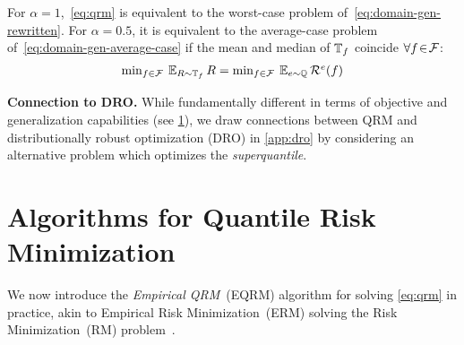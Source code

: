 \documentclass{article}
\begin{document}
\begin{proposition}\label{prop:average-case-equiv}
For $\alpha\!\! =\!\! 1$,~\eqref{eq:qrm} is equivalent to the worst-case problem of~\eqref{eq:domain-gen-rewritten}.
 For $\alpha\! =\! 0.5$, it
%
%
is equivalent to the average-case problem of~\eqref{eq:domain-gen-average-case} if the mean and median of $\mathbb{T}_f$ coincide $\forall f\! \in\! \mathcal{F}$:
%
%
\begin{align}\label{eq:dg-average-case}
\textstyle
    \min_{f\in\mathcal{F}} \: \operatorname{\mathbb{E}}_{R\sim\mathbb{T}_f} R =
    \min_{f\in\mathcal{F}} \: \operatorname{\mathbb{E}}_{e\sim\mathbb{Q}} \mathcal{R}^e(f)
\end{align}%
%
%
%
%
\end{proposition}%
%





%
%
%
%
%
%
%
%
%
%
%
%
%
%
%
%

%




%
%
%
%
%
%
%

%


%
%
%
%
%
%
%
%
%
%
%
%
%
%
%
%
%
%
%
%
%
%
%
%
%


\textbf{Connection to DRO.}  While fundamentally different in terms of objective and generalization capabilities (see \cref{sec:qrm_algs}), we draw connections between QRM and distributionally robust optimization (DRO) in \cref{app:dro} by considering an alternative problem which optimizes the \emph{superquantile}.

%
%
%
%
%
%
%
%
%

\section{Algorithms for Quantile Risk Minimization}\label{sec:qrm_algs}\vspace{-1mm}
We now introduce the \emph{Empirical QRM}~(EQRM) algorithm for solving \eqref{eq:qrm} in practice, akin to Empirical Risk Minimization~(ERM) solving the Risk Minimization~(RM) problem~\citep{Vapnik98}. 
%
\end{document}
